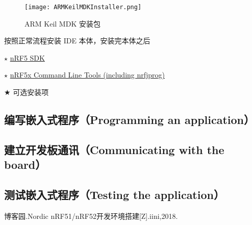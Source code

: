 \documentclass{WHUResearch}  %
\begin{document}
\begin{figure}[htbp]
\centering
  \texttt{[image: ARMKeilMDKInstaller.png]}
  \caption{ARM Keil MDK 安装包}
  \label{fig:ARMKeilMDKInstaller}
\end{figure}

按照正常流程安装 IDE 本体，安装完本体之后

$\star$ \href{https://developer.nordicsemi.com/}{nRF5 SDK}

$\star$ \href{https://www.nordicsemi.com/Software-and-Tools/Development-Tools/nRF5-Command-Line-Tools/Download#infotabs}{nRF5x Command Line Tools (including nrfjprog)}

$\bigstar$ 可选安装项

\subsection{编写嵌入式程序（Programming an application）}

\subsection{建立开发板通讯（Communicating with the board）}

\subsection{测试嵌入式程序（Testing the application）}

\cleardoublepage{}
{}
\begin{thebibliography}{000}

   博客园.Nordic nRF51/nRF52开发环境搭建[Z].iini,2018.  
  
\end{thebibliography}

\cleardoublepage
\end{document}
